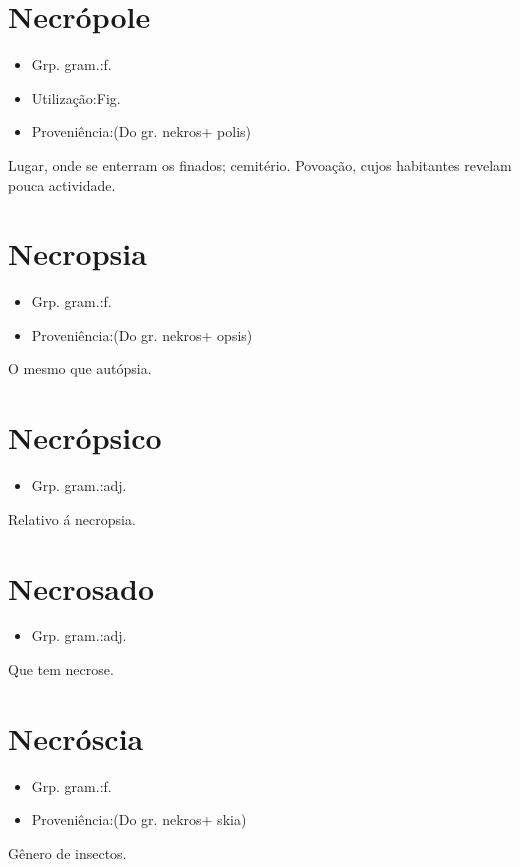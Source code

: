 \section{Necrópole}
\begin{itemize}
\item {Grp. gram.:f.}
\end{itemize}
\begin{itemize}
\item {Utilização:Fig.}
\end{itemize}
\begin{itemize}
\item {Proveniência:(Do gr. \textunderscore nekros\textunderscore  + \textunderscore polis\textunderscore )}
\end{itemize}
Lugar, onde se enterram os finados; cemitério.
Povoação, cujos habitantes revelam pouca actividade.
\section{Necropsia}
\begin{itemize}
\item {Grp. gram.:f.}
\end{itemize}
\begin{itemize}
\item {Proveniência:(Do gr. \textunderscore nekros\textunderscore  + \textunderscore opsis\textunderscore )}
\end{itemize}
O mesmo que \textunderscore autópsia\textunderscore .
\section{Necrópsico}
\begin{itemize}
\item {Grp. gram.:adj.}
\end{itemize}
Relativo á necropsia.
\section{Necrosado}
\begin{itemize}
\item {Grp. gram.:adj.}
\end{itemize}
Que tem necrose.
\section{Necróscia}
\begin{itemize}
\item {Grp. gram.:f.}
\end{itemize}
\begin{itemize}
\item {Proveniência:(Do gr. \textunderscore nekros\textunderscore  + \textunderscore skia\textunderscore )}
\end{itemize}
Gênero de insectos.

